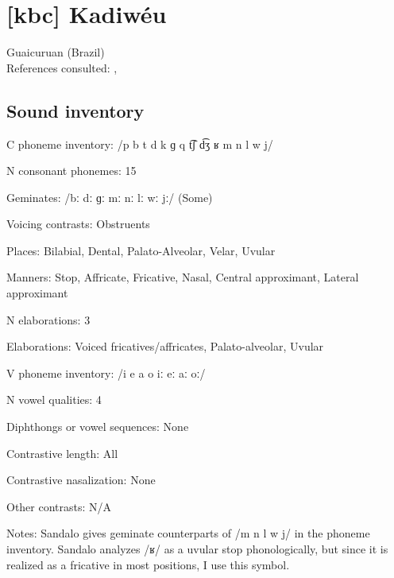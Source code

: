 {\section*{[kbc] Kadiwéu} %
Guaicuruan (Brazil)\medskip\\
References consulted: \citet{Braggio1981}, \citet{Sandalo1997}

\subsection*{Sound inventory}
\begin{appendixdesc}

\item[C phoneme inventory:] /p b t d k ɡ q t͡ʃ d͡ʒ ʁ m n l w j/

\item[N consonant phonemes:] 15

\item[Geminates:] /bː dː ɡː mː nː lː wː jː/ (Some)

\item[Voicing contrasts:] Obstruents

\item[Places:] Bilabial, Dental, Palato-Alveolar, Velar, Uvular

\item[Manners:] Stop, Affricate, Fricative, Nasal, Central approximant, Lateral approximant

\item[N elaborations:] 3

\item[Elaborations:] Voiced fricatives/affricates, Palato-alveolar, Uvular

\item[V phoneme inventory:] /i e a o iː eː aː oː/

\item[N vowel qualities:] 4

\item[Diphthongs or vowel sequences:] None

\item[Contrastive length:] All

\item[Contrastive nasalization:] None

\item[Other contrasts:] N/A

\item[Notes:] Sandalo gives geminate counterparts of /m n l w j/ in the phoneme inventory. Sandalo analyzes /ʁ/ as a uvular stop phonologically, but since it is realized as a fricative in most positions, I use this symbol.
\end{appendixdesc}
}
